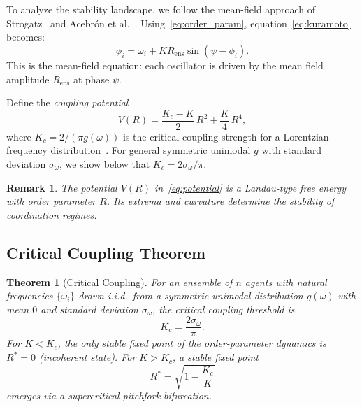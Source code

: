 \documentclass[twocolumn,10pt]{article}
\newtheorem{theorem}{Theorem}[section]
\newtheorem{remark}{Remark}[section]
\newcommand{\Rens}{R_{\mathrm{ens}}}
\newcommand{\Kc}{K_c}
\newcommand{\sigmaomega}{\sigma_{\omega}}
\begin{document}
To analyze the stability landscape, we follow the mean-field approach of
Strogatz~\cite{Strogatz2000} and Acebr\'{o}n et al.~\cite{Acebron2005}.
Using~\eqref{eq:order_param}, equation~\eqref{eq:kuramoto} becomes:
\begin{equation}
\label{eq:mf}
  \dot{\phi}_i = \omega_i + K\Rens\sin(\psi - \phi_i).
\end{equation}
This is the mean-field equation: each oscillator is driven by the mean field
amplitude $\Rens$ at phase $\psi$.

Define the \emph{coupling potential}
\begin{equation}
\label{eq:potential}
  V(R) = \frac{\Kc - K}{2}\,R^2 + \frac{K}{4}\,R^4,
\end{equation}
where $\Kc = 2/(\pi g(\bar{\omega}))$ is the critical coupling strength for a
Lorentzian frequency distribution~\cite{Strogatz2000}. For general symmetric
unimodal $g$ with standard deviation $\sigmaomega$, we show below that
$\Kc = 2\sigmaomega/\pi$.

\begin{remark}
The potential $V(R)$ in~\eqref{eq:potential} is a Landau-type free energy with
order parameter $R$. Its extrema and curvature determine the stability of
coordination regimes.
\end{remark}

\subsection{Critical Coupling Theorem}

\begin{theorem}[Critical Coupling]
\label{thm:critical}
For an ensemble of $n$ agents with natural frequencies $\{\omega_i\}$ drawn
i.i.d.\ from a symmetric unimodal distribution $g(\omega)$ with mean $0$ and
standard deviation $\sigmaomega$, the critical coupling threshold is
\begin{equation}
\label{eq:kc}
  \Kc = \frac{2\sigmaomega}{\pi}.
\end{equation}
For $K < \Kc$, the only stable fixed point of the order-parameter dynamics is
$R^* = 0$ (incoherent state). For $K > \Kc$, a stable fixed point
\begin{equation}
\label{eq:rstar}
  R^* = \sqrt{1 - \frac{\Kc}{K}}
\end{equation}
emerges via a supercritical pitchfork bifurcation.
\end{theorem}
\end{document}
